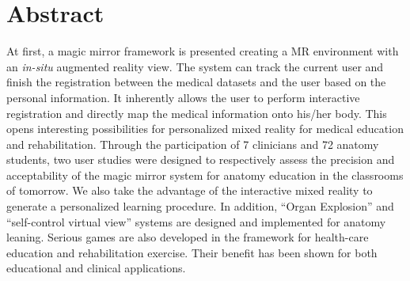 %
\chapter*{Abstract}
\label{sec:abstract}



At first, a magic mirror framework is presented creating a MR environment with an \textit{in-situ} augmented reality view. The system can track the current user and finish the registration between the medical datasets and the user based on the personal information. It inherently allows the user to perform interactive registration and directly map the medical information onto his/her body. This opens interesting possibilities for personalized mixed reality for medical education and rehabilitation. Through the participation of 7 clinicians and 72 anatomy students, two user studies were designed to respectively assess the precision and acceptability of the magic mirror system for anatomy education in the classrooms of tomorrow. We also take the advantage of the interactive mixed reality to generate a personalized learning procedure. In addition, ``Organ Explosion'' and ``self-control virtual view'' systems are designed and implemented for anatomy leaning. Serious games are also developed in the framework for health-care education and rehabilitation exercise.
Their benefit has been shown for both educational and clinical applications.

